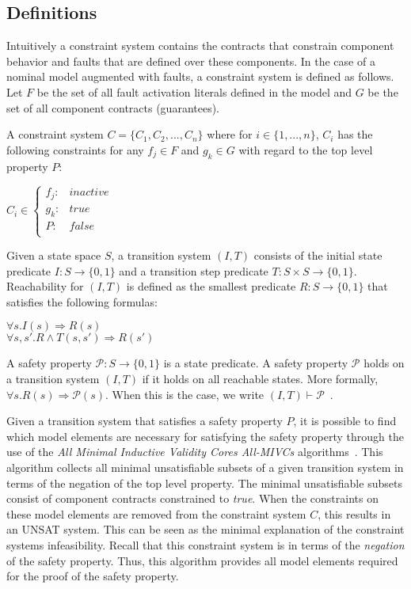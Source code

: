 \subsection{Definitions}
\label{sec:definitions}
Intuitively a constraint system contains the contracts that constrain component behavior and faults that are defined over these components. In the case of a nominal model augmented with faults, a constraint system is defined as follows. Let $F$ be the set of all fault activation literals defined in the model and $G$ be the set of all component contracts (guarantees). 

\begin{definition}A constraint system $C = \{C_1,C_2,...,C_n\}$ where for $i \in \{1,...,n\}$, $C_i$ has the following constraints for any $f_j \in F$ and $g_k \in G$ with regard to the top level property $P$: 
\begin{center}
$C_i \in \left\{ \begin{array}{ll}
	f_j :&  inactive\\
	g_k :& true\\
	P :& false\\
\end{array}\right.$	
\end{center}
\label{def:constraintsystem}
\end{definition}

Given a state space $S$, a transition system $(I,T)$ consists of the initial state predicate $I : S \rightarrow \{0,1\}$ and a transition step predicate $T : S \times S \rightarrow \{0,1\}$. Reachability for $(I,T)$ is defined as the smallest predicate $R : S \rightarrow \{0,1\}$ that satisfies the following formulas:
\begin{center}
$\forall s. I(s) \Rightarrow R(s)$\\
$\forall s, s' .  R \land T(s,s') \Rightarrow R(s')$\\
\end{center}
A safety property $\mathcal{P} : S \to \{0,1\}$ is a state predicate. A safety property $\mathcal{P}$ holds on a transition system $(I,T)$ if it holds on all reachable states. More formally, $\forall s . R(s) \Rightarrow \mathcal{P}(s)$. When this is the case, we write $(I,T) \vdash\mathcal{P}$~\cite{Ghassabani2017EfficientGO}. 

Given a transition system that satisfies a safety property $P$, it is possible to find which model elements are necessary for satisfying the safety property through the use of the \textit{All Minimal Inductive Validity Cores All-MIVCs} algorithms~\cite{Ghassabani2017EfficientGO,bendik2018online}. This algorithm collects all minimal unsatisfiable subsets of a given transition system in terms of the negation of the top level property. The minimal unsatisfiable subsets consist of component contracts constrained to \textit{true}. When the constraints on these model elements are removed from the constraint system $C$, this results in an UNSAT system. This can be seen as the minimal explanation of the constraint systems infeasibility. Recall that this constraint system is in terms of the \textit{negation} of the safety property. Thus, this algorithm provides all model elements required for the proof of the safety property. 

